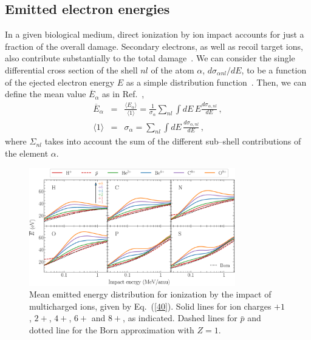 \documentclass[10pt,showpacs,showkeys,twocolumn]{revtex4}
\begin{document}
\subsection{Emitted electron energies}
\label{subsec:meanener}

In a given biological medium, direct ionization by ion impact accounts 
for just a fraction of the overall damage. Secondary electrons, as well 
as recoil target ions, also contribute substantially to the total damage~\cite{Denifl2011}. 
We can consider the single differential cross section of the shell 
$nl$ of the atom $\alpha$, $d\sigma_{\alpha nl}/dE$, to be a function 
of the ejected electron energy $E$ as a simple distribution 
function~\cite{surdutovic2018}. Then, we can define the mean value 
$\overline{E}_{\alpha}$ as in Ref.~\cite{abril2015},
\begin{eqnarray}
\overline{E}_{\alpha} &=&\frac{\langle E_{\alpha}\rangle}{\langle
1\rangle}=\frac{1}{\sigma_{\alpha}}\sum\limits_{nl}\int dE\,E
\frac{d\sigma_{\alpha,nl}}{dE}\,,  
\label{40} \\
\langle 1\rangle &=&\sigma_{\alpha}=\sum\limits_{nl}\int dE\,
\frac{d\sigma_{\alpha,nl}}{dE}\,,  
\label{50}
\end{eqnarray}
where $\Sigma_{nl}$ takes into account the sum of the different 
sub--shell contributions of the element $\alpha$.

\begin{figure}[t!]
\centering
\includegraphics[width=0.8\textwidth]{figuras/ener_mean.eps}
\caption{Mean emitted energy distribution for ionization by the impact 
of multicharged ions, given by Eq.~(\ref{40}). 
Solid lines for ion charges $+1$, $2+$, $4+$, $6+$ and $8+$, as indicated.
Dashed lines for $\bar{p}$ and dotted line for the Born approximation with $Z=1$.}
\label{fig:emittedener}
\end{figure} 
\end{document}

